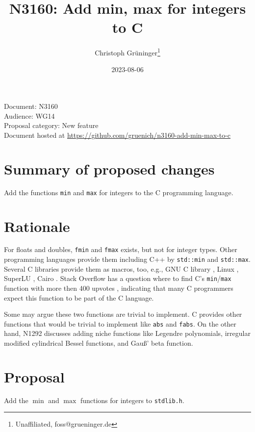 \documentclass[a4paper,10pt]{scrartcl}
\title{N3160: Add min, max for integers to C}
\author{Christoph Grüninger\footnote{Unaffiliated, foss@grueninger.de}}
\date{2023-08-06}
\begin{document}
\lstset{language=C,basicstyle=\ttfamily}

\maketitle

\noindent
Document: N3160\\
Audience: WG14\\
Proposal category: New feature\\
Document hosted at \url{https://github.com/gruenich/n3160-add-min-max-to-c}

\section{Summary of proposed changes}

Add the functions \lstinline{min} and \lstinline{max} for integers to the C programming language.

\section{Rationale}

For floats and doubles, \lstinline{fmin} and \lstinline{fmax} exists, but not for integer types. Other
programming languages provide them including C++ by \lstinline{std::min} and \lstinline{std::max}. Several
C libraries provide them as macros, too, e.g., GNU C library \cite{GLibc}, Linux \cite{Linux},
SuperLU \cite{SuperLU}, Cairo \cite{Cairo}.
Stack Overflow has a question where to find C's \lstinline{min}/\lstinline{max} function with more
then 400 upvotes \cite{Stackoverflow}, indicating that many C programmers expect this function to be
part of the C language.

Some may argue these two functions are trivial to implement. C provides other functions that would be trivial to implement like \lstinline{abs} and \lstinline{fabs}. On the other hand, N1292 \cite{N1292} discusses adding niche functions like Legendre polynomials, irregular modified cylindrical Bessel functions, and Gauß' beta function.

\section{Proposal}
Add the $\operatorname{min}$ and $\operatorname{max}$ functions for integers to \lstinline{stdlib.h}.
\end{document}
